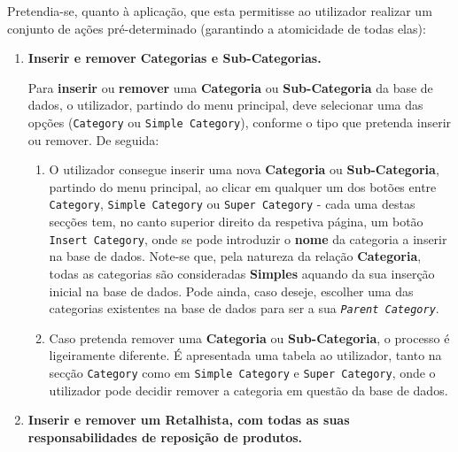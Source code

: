 \documentclass[12pt,a4paper]{article}
\begin{document}
\vspace*{0.5cm}

Pretendia-se, quanto à aplicação, que esta permitisse ao utilizador realizar um conjunto
de ações pré-determinado (garantindo a atomicidade de todas elas):


\begin{enumerate}
  \item \textbf{Inserir e remover Categorias e Sub-Categorias.}

        Para \textbf{inserir} ou \textbf{remover} uma \textbf{Categoria} ou \textbf{Sub-Categoria}
        da base de dados, o utilizador, partindo do menu principal, deve selecionar
        uma das opções (\texttt{Category} ou \texttt{Simple Category}), conforme o tipo
        que pretenda inserir ou remover. De seguida:

        \begin{enumerate}
          \item O utilizador consegue inserir uma nova \textbf{Categoria} ou \textbf{Sub-Categoria}, partindo
                do menu principal, ao clicar em qualquer um dos botões entre \texttt{Category},
                \texttt{Simple Category} ou \texttt{Super Category} - cada uma destas secções
                tem, no canto superior direito da respetiva página, um botão \texttt{Insert Category}, onde se pode
                introduzir o \textbf{nome} da categoria a inserir na base de dados. Note-se que,
                pela natureza da relação \textbf{Categoria}, todas as categorias são consideradas
                \textbf{Simples} aquando da sua inserção inicial na base de dados. Pode ainda, caso deseje,
                escolher uma das categorias existentes na base de dados para ser a sua
                \textit{\texttt{Parent Category}}.

          \item Caso pretenda remover uma \textbf{Categoria} ou \textbf{Sub-Categoria},
                o processo é ligeiramente diferente. É apresentada uma tabela ao utilizador,
                tanto na secção \texttt{Category} como em \texttt{Simple Category} e \texttt{Super Category}, onde o utilizador
                pode decidir remover a categoria em questão da base de dados.
        \end{enumerate}

  \item \textbf{Inserir e remover um Retalhista, com todas as suas responsabilidades
          de reposição de produtos.}


\end{enumerate}
\end{document}
